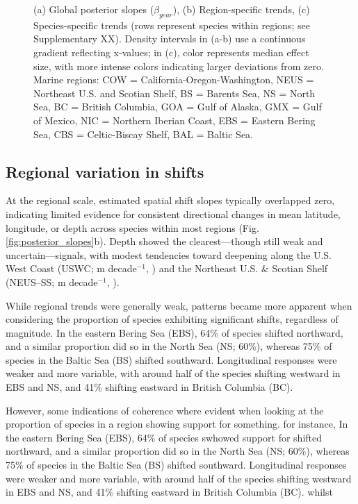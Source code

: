 \documentclass[lineno,pdflatex,sn-nature]{sn-jnl}%
\begin{document}
\begin{figure}[h]
{(a) Global posterior slopes ($\beta_{year}$),  
(b) Region-specific trends,  
(c) Species-specific trends (rows represent species within regions; see Supplementary XX).  
Density intervals in (a-b) use a continuous gradient reflecting x-values; in (c), color represents median effect size, with more intense colors indicating larger deviations from zero.  
Marine regions: COW = California-Oregon-Washington, NEUS = Northeast U.S. and Scotian Shelf, BS = Barents Sea, NS = North Sea, BC = British Columbia, GOA = Gulf of Alaska, GMX = Gulf of Mexico, NIC = Northern Iberian Coast, EBS = Eastern Bering Sea, CBS = Celtic-Biscay Shelf, BAL = Baltic Sea.}
\end{figure}

\subsection{Regional variation in shifts}



At the regional scale, estimated spatial shift slopes typically overlapped zero, indicating limited evidence for consistent directional changes in mean latitude, longitude, or depth across species within most regions (Fig.\ref{fig:posterior_slopes}b). Depth showed the clearest—though still weak and uncertain—signals, with modest tendencies toward deepening along the U.S. West Coast (USWC; \DepthUSWCMedian{} m decade$^{-1}$, \DepthUSWCCI{}) and the Northeast U.S. \& Scotian Shelf (NEUS–SS; \DepthNEUSMedian{} m decade$^{-1}$, \DepthNEUSCI{}).

While regional trends were generally weak, patterns became more apparent when considering the proportion of species exhibiting significant shifts, regardless of magnitude. In the eastern Bering Sea (EBS), 64\% of species shifted northward, and a similar proportion did so in the North Sea (NS; 60\%), whereas 75\% of species in the Baltic Sea (BS) shifted southward. Longitudinal responses were weaker and more variable, with around half of the species shifting westward in EBS and NS, and 41\% shifting eastward in British Columbia (BC). 


However, some indications of coherence where evident when looking at the proportion of species in a region showing support for something. for instance, In the eastern Bering Sea (EBS), 64\% of species swhowed support for shifted northward, and a similar proportion did so in the North Sea (NS; 60\%), whereas 75\% of species in the Baltic Sea (BS) shifted southward. Longitudinal responses were weaker and more variable, with around half of the species shifting westward in EBS and NS, and 41\% shifting eastward in British Columbia (BC). whilst 
\end{document}
